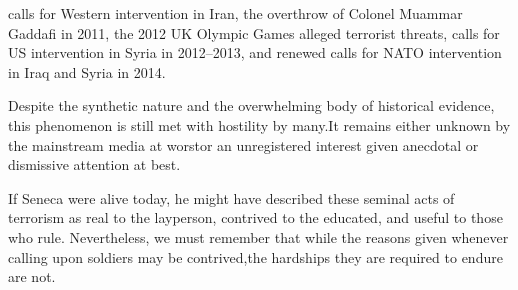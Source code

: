 \footnotecite[shipler2012]
\footnotecite[schwartz2013]
calls for Western intervention in Iran, %
\footnotecite[shakir2008] 
the overthrow of Colonel Muammar Gaddafi in 2011, %
the 2012 UK Olympic Games alleged terrorist threats, %
calls for US intervention in Syria in 2012--2013, %
\footnotecite[istreams2013]
and renewed calls for NATO intervention in Iraq and Syria in 2014.

Despite the synthetic nature and the overwhelming body of historical evidence, this phenomenon is still met with hostility by many. It remains either unknown by the mainstream media at worst or an unregistered interest given anecdotal or dismissive attention at best.

If Seneca were alive today, he might have described these seminal acts of terrorism as real to the layperson, contrived to the educated, and useful to those who rule. Nevertheless, we must remember that while the reasons given whenever calling upon soldiers may be contrived, the hardships they are required to endure are not.

